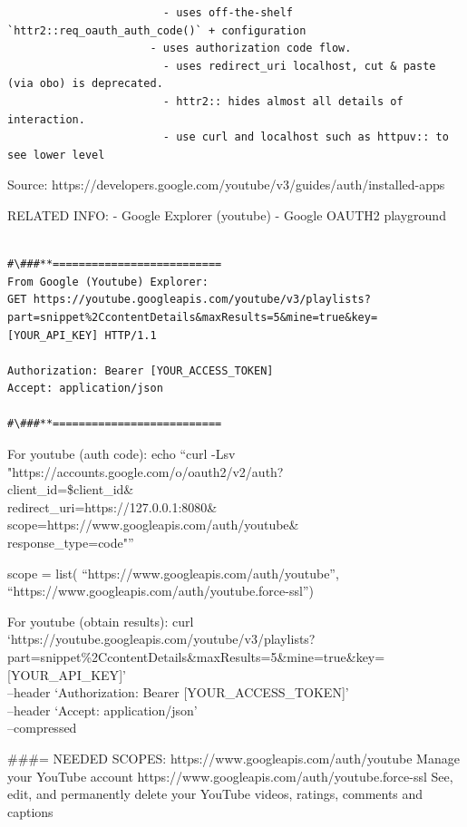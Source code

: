 \documentclass[
  letterpaper,
  DIV=11,
  numbers=noendperiod]{scrartcl}
\begin{document}
\begin{verbatim}
                        - uses off-the-shelf `httr2::req_oauth_auth_code()` + configuration
                      - uses authorization code flow.
                        - uses redirect_uri localhost, cut & paste (via obo) is deprecated.
                        - httr2:: hides almost all details of interaction.
                        - use curl and localhost such as httpuv:: to see lower level
\end{verbatim}

Source:
https://developers.google.com/youtube/v3/guides/auth/installed-apps

RELATED INFO: - Google Explorer (youtube) - Google OAUTH2 playground

\begin{verbatim}

#\###**==========================
From Google (Youtube) Explorer:
GET https://youtube.googleapis.com/youtube/v3/playlists?part=snippet%2CcontentDetails&maxResults=5&mine=true&key=[YOUR_API_KEY] HTTP/1.1

Authorization: Bearer [YOUR_ACCESS_TOKEN]
Accept: application/json

#\###**==========================
\end{verbatim}

For youtube (auth code): echo ``curl -Lsv
"https://accounts.google.com/o/oauth2/v2/auth?\\
client\_id=\$client\_id\&\\
redirect\_uri=https://127.0.0.1:8080\&\\
scope=https://www.googleapis.com/auth/youtube\&\\
response\_type=code"''

scope = list( ``https://www.googleapis.com/auth/youtube'',
``https://www.googleapis.com/auth/youtube.force-ssl'')

For youtube (obtain results): curl\\
`https://youtube.googleapis.com/youtube/v3/playlists?part=snippet\%2CcontentDetails\&maxResults=5\&mine=true\&key={[}YOUR\_API\_KEY{]}'\\
--header `Authorization: Bearer {[}YOUR\_ACCESS\_TOKEN{]}'\\
--header `Accept: application/json'\\
--compressed

\#\#\#= NEEDED SCOPES: https://www.googleapis.com/auth/youtube Manage
your YouTube account https://www.googleapis.com/auth/youtube.force-ssl
See, edit, and permanently delete your YouTube videos, ratings, comments
and captions
\end{document}

